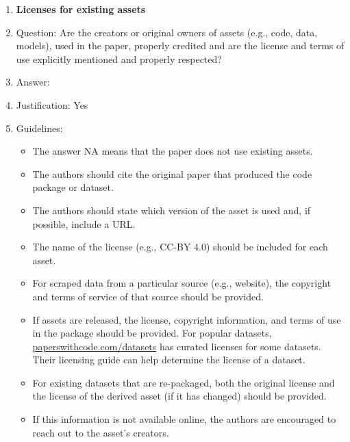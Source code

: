 \documentclass{article}
\begin{document}
{\begin{enumerate}
\item {\bf Licenses for existing assets}
    \item[] Question: Are the creators or original owners of assets (e.g., code, data, models), used in the paper, properly credited and are the license and terms of use explicitly mentioned and properly respected?
    \item[] Answer: \answerYes{} %
    \item[] Justification: Yes
    \item[] Guidelines:
    \begin{itemize}
        \item The answer NA means that the paper does not use existing assets.
        \item The authors should cite the original paper that produced the code package or dataset.
        \item The authors should state which version of the asset is used and, if possible, include a URL.
        \item The name of the license (e.g., CC-BY 4.0) should be included for each asset.
        \item For scraped data from a particular source (e.g., website), the copyright and terms of service of that source should be provided.
        \item If assets are released, the license, copyright information, and terms of use in the package should be provided. For popular datasets, \url{paperswithcode.com/datasets} has curated licenses for some datasets. Their licensing guide can help determine the license of a dataset.
        \item For existing datasets that are re-packaged, both the original license and the license of the derived asset (if it has changed) should be provided.
        \item If this information is not available online, the authors are encouraged to reach out to the asset's creators.
    \end{itemize}


\end{enumerate}}
\end{document}
